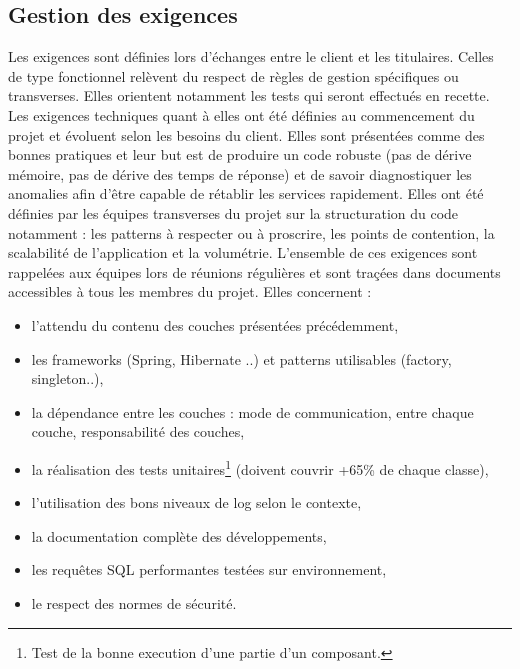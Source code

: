 \documentclass[12pt,a4paper]{article}
\begin{document}
\subsection{Gestion des exigences}
Les exigences sont définies lors d'échanges entre le client et les titulaires. Celles de type fonctionnel relèvent du respect de règles de gestion spécifiques ou transverses.
\smallbreak
Elles orientent notamment les tests qui seront effectués en recette. Les exigences techniques quant à elles ont été définies au commencement du projet et évoluent selon les besoins du client. Elles sont présentées comme des bonnes pratiques et leur but est de produire un code robuste (pas de dérive mémoire, pas de dérive des temps de réponse) et de savoir diagnostiquer les anomalies  afin d'être capable de rétablir les services rapidement. Elles ont été définies par les équipes transverses du projet sur la structuration du code notamment : les patterns à respecter ou à proscrire, les points de contention, la scalabilité de l'application et la volumétrie.
\smallbreak
L'ensemble de ces exigences sont rappelées aux équipes lors de réunions régulières et sont traçées dans documents accessibles à tous les membres du projet.
\smallbreak
Elles concernent :
\smallbreak
\begin{itemize}	
\item l'attendu du contenu des couches présentées précédemment,
\item les frameworks (Spring, Hibernate ..) et patterns utilisables (factory, singleton..),
\item la dépendance entre les couches : mode de communication, entre chaque couche, responsabilité des couches,
\item la réalisation des tests unitaires\footnote{Test de la bonne execution d'une partie d'un composant.} (doivent couvrir +65\% de chaque classe),
\item l'utilisation des bons niveaux de log selon le contexte,
\item la documentation complète des développements,
\item les requêtes \gls{SQL} performantes testées sur environnement,
\item le respect des normes de sécurité.
\end{itemize}
\medbreak
\end{document}

